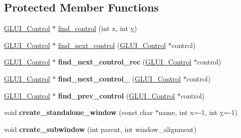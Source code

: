 \subsection*{Protected Member Functions}
\begin{DoxyCompactItemize}
\item 
\hyperlink{class_g_l_u_i___control}{G\+L\+U\+I\+\_\+\+Control} $\ast$ \hyperlink{class_g_l_u_i___main_ac4954c3b7790085da920a6f19c033843}{find\+\_\+control} (int x, int \hyperlink{_ice_utils_8h_aa7ffaed69623192258fb8679569ff9ba}{y})
\item 
\hyperlink{class_g_l_u_i___control}{G\+L\+U\+I\+\_\+\+Control} $\ast$ \hyperlink{class_g_l_u_i___main_ad1bf3a4ba72353d87315a57f12703bcd}{find\+\_\+next\+\_\+control} (\hyperlink{class_g_l_u_i___control}{G\+L\+U\+I\+\_\+\+Control} $\ast$control)
\item 
\hypertarget{class_g_l_u_i___main_a2c310ed285d93969a0cb132da882d2c6}{\hyperlink{class_g_l_u_i___control}{G\+L\+U\+I\+\_\+\+Control} $\ast$ {\bfseries find\+\_\+next\+\_\+control\+\_\+rec} (\hyperlink{class_g_l_u_i___control}{G\+L\+U\+I\+\_\+\+Control} $\ast$control)}\label{class_g_l_u_i___main_a2c310ed285d93969a0cb132da882d2c6}

\item 
\hypertarget{class_g_l_u_i___main_a5dc8a5cad780b8fe712c301b72e5c8aa}{\hyperlink{class_g_l_u_i___control}{G\+L\+U\+I\+\_\+\+Control} $\ast$ {\bfseries find\+\_\+next\+\_\+control\+\_\+} (\hyperlink{class_g_l_u_i___control}{G\+L\+U\+I\+\_\+\+Control} $\ast$control)}\label{class_g_l_u_i___main_a5dc8a5cad780b8fe712c301b72e5c8aa}

\item 
\hypertarget{class_g_l_u_i___main_a3e3529546ab8d4c358c2f425a11a6ca3}{\hyperlink{class_g_l_u_i___control}{G\+L\+U\+I\+\_\+\+Control} $\ast$ {\bfseries find\+\_\+prev\+\_\+control} (\hyperlink{class_g_l_u_i___control}{G\+L\+U\+I\+\_\+\+Control} $\ast$control)}\label{class_g_l_u_i___main_a3e3529546ab8d4c358c2f425a11a6ca3}

\item 
\hypertarget{class_g_l_u_i___main_a524a3d3e51e01707a6fe1916bfdd4e1f}{void {\bfseries create\+\_\+standalone\+\_\+window} (const char $\ast$name, int x=-\/1, int \hyperlink{_ice_utils_8h_aa7ffaed69623192258fb8679569ff9ba}{y}=-\/1)}\label{class_g_l_u_i___main_a524a3d3e51e01707a6fe1916bfdd4e1f}

\item 
\hypertarget{class_g_l_u_i___main_a4a05365e245aa1751f5b828bdbd78b0e}{void {\bfseries create\+\_\+subwindow} (int parent, int window\+\_\+alignment)}\label{class_g_l_u_i___main_a4a05365e245aa1751f5b828bdbd78b0e}


\end{DoxyCompactItemize}
